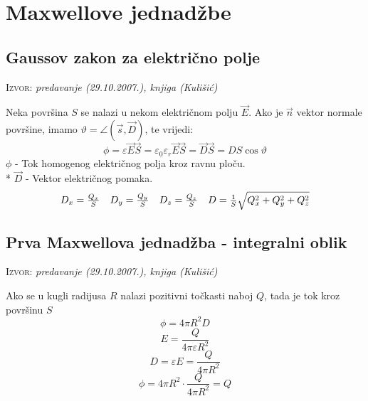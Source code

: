\documentclass{report}
\begin{document}
\tableofcontents
\newpage

\chapter{Maxwellove jednadžbe}

\section{Gaussov zakon za električno polje}
\small \textsc{Izvor:} \textit{predavanje (29.10.2007.), knjiga (Kulišić)}

Neka površina $S$ se nalazi u nekom električnom polju $\vec{E}$. Ako je $\vec{n}$ vektor normale površine, imamo $\vartheta = \angle \left( {\vec s,\vec D} \right)$, te vrijedi:
\begin{equation}
	\phi  = \varepsilon \vec{E} \vec{S} = \varepsilon _0 \varepsilon _r \vec{E} \vec{S} = \vec{D} \vec{S} = DS\cos \vartheta 
	\label{tok-opcenito}
\end{equation}
$\phi $ - Tok homogenog električnog polja kroz ravnu ploču.\\*
$\vec{D} $ - Vektor električnog pomaka.
$$\begin{array}{*{20}c}
  {D_x  = \frac{{Q_x }}
	{S}} & {D_y  = \frac{{Q_y }}
	{S}} & {D_z  = \frac{{Q_z }}
	{S}} & {D = \frac{1}
	{S}\sqrt {Q_x ^2  + Q_y ^2  + Q_z ^2 } }  \\
\end{array} $$

\section{Prva Maxwellova jednadžba - integralni oblik}
\small \textsc{Izvor:} \textit{predavanje (29.10.2007.), knjiga (Kulišić)}

Ako se u kugli radijusa $R$ nalazi pozitivni točkasti naboj $Q$, tada je tok kroz površinu $S$
$$\phi = 4\pi R^2 D$$
$$E = \frac{Q}{4\pi \varepsilon R^2} $$
$$D = \varepsilon E = \frac{Q}{4\pi R^2} $$
\begin{equation}
	\phi = 4\pi R^2 \cdot \frac{Q}{4\pi R^2} = Q
	\label{tok-polja-kroz-kuglinu-plohu}
\end{equation}
\end{document}
